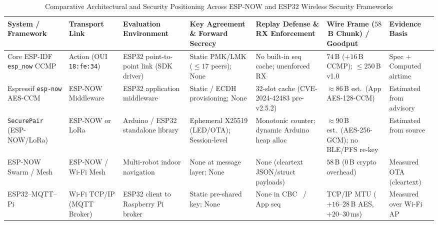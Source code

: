 \documentclass[conference]{IEEEtran}
\renewcommand{\arraystretch}{0.96}
\begin{document}
\begin{table}[t]
\centering
\caption{Comparative Architectural and Security Positioning Across ESP-NOW and ESP32 Wireless Security Frameworks}
\label{tab:related_work}
\setlength{\tabcolsep}{3pt}
\scriptsize
\renewcommand{\arraystretch}{1.02}
\begin{tabularx}{\textwidth}{@{}>{\raggedright\arraybackslash}p{}>{\raggedright\arraybackslash}p{}>{\raggedright\arraybackslash}p{}>{\raggedright\arraybackslash}p{}X>{\raggedright\arraybackslash}p{}>{\raggedright\arraybackslash}p{}@{}}
\toprule
\textbf{System / Framework} & \textbf{Transport Link} & \textbf{Evaluation Environment} & \textbf{Key Agreement \& Forward Secrecy} & \textbf{Replay Defense \& RX Enforcement} & \textbf{Wire Frame ($58$\,B Chunk) / Goodput} & \textbf{Evidence Basis} \\
\midrule
Core ESP-IDF \texttt{esp\_now} CCMP~\cite{espressif_espnow,espressif_issue15179} & 802.11 Action (OUI \texttt{18:fe:34}) & ESP32 point-to-point link (SDK driver) & Static PMK/LMK ($\le 17$ peers); None & No built-in seq cache; unenforced RX~\cite{espressif_issue15179} & $74$\,B ($+16$\,B CCMP); $\le 250$\,B v1.0 & Spec + Computed airtime \\
Espressif \texttt{esp-now} AES-CCM~\cite{nozomi2024,nvd_cve42483} & ESP-NOW Middleware & ESP32 application middleware & Static / ECDH provisioning; None & 32-slot cache (CVE-2024-42483 pre-v2.5.2) & $\approx 86$\,B est.\ (App AES-128-CCM) & Estimated from advisory~\cite{nozomi2024} \\
\texttt{SecurePair} (ESP-NOW/LoRa)~\cite{securepair2026} & ESP-NOW or LoRa & Arduino / ESP32 standalone library & Ephemeral X25519 (LED/OTA); Session-level & Monotonic counter; dynamic Arduino heap alloc & $\approx 90$\,B est.\ (AES-256-GCM); no BLE/PFS re-key & Estimated from source \\
ESP-NOW Swarm / Mesh~\cite{caniago2026} & ESP-NOW / Wi-Fi Mesh & Multi-robot indoor navigation & None at message layer; None & None (cleartext JSON/struct payloads) & $58$\,B ($0$\,B crypto overhead) & Measured OTA (cleartext) \\
ESP32--MQTT--Pi~\cite{setiawan2021,amirkhanova2026} & Wi-Fi TCP/IP (MQTT Broker) & ESP32 client to Raspberry Pi broker & Static pre-shared key; None & None in CBC~\cite{setiawan2021} / App seq~\cite{amirkhanova2026} & TCP/IP MTU ($+16\text{--}28$\,B AES, $+20\text{--}30$\,ms) & Measured over Wi-Fi AP \\

\end{tabularx}
\end{table}
\end{document}
